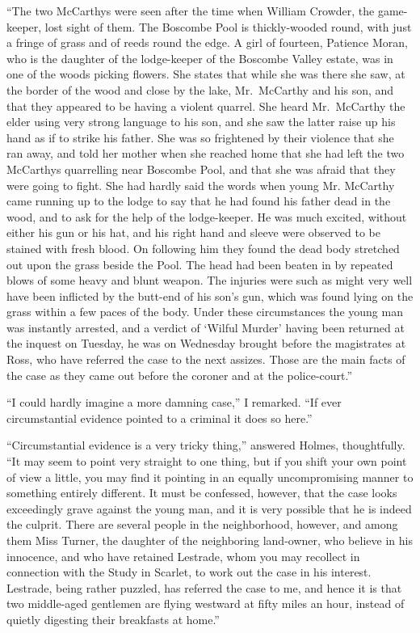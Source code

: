 “The two McCarthys were seen after the time when William
Crowder, the game-keeper, lost sight of them. The
Boscombe Pool is thickly-wooded round, with just a fringe of
grass and of reeds round the edge. A girl of fourteen, Patience
Moran, who is the daughter of the lodge-keeper of
the Boscombe Valley estate, was in one of the woods picking
flowers. She states that while she was there she saw, at
the border of the wood and close by the lake, Mr.~McCarthy
and his son, and that they appeared to be having a violent
quarrel. She heard Mr.~McCarthy the elder using very strong
language to his son, and she saw the latter raise up his hand
as if to strike his father. She was so frightened by their violence
that she ran away, and told her mother when she reached
home that she had left the two McCarthys quarrelling near
Boscombe Pool, and that she was afraid that they were going
to fight. She had hardly said the words when young Mr.
McCarthy came running up to the lodge to say that he had
found his father dead in the wood, and to ask for the help of
the lodge-keeper. He was much excited, without either his
gun or his hat, and his right hand and sleeve were observed
to be stained with fresh blood. On following him they found
the dead body stretched out upon the grass beside the Pool.
The head had been beaten in by repeated blows of some heavy
and blunt weapon. The injuries were such as might very
well have been inflicted by the butt-end of his son’s gun,
which was found lying on the grass within a few paces of the
body. Under these circumstances the young man was instantly
arrested, and a verdict of ‘Wilful Murder’ having been
returned at the inquest on Tuesday, he was on Wednesday
brought before the magistrates at Ross, who have referred the
case to the next assizes. Those are the main facts of the case
as they came out before the coroner and at the police-court.”

“I could hardly imagine a more damning case,” I remarked.
“If ever circumstantial evidence pointed to a criminal
it does so here.”

“Circumstantial evidence is a very tricky thing,” answered
Holmes, thoughtfully. “It may seem to point very straight
to one thing, but if you shift your own point of view a little,
you may find it pointing in an equally uncompromising manner
to something entirely different. It must be confessed,
however, that the case looks exceedingly grave against the
young man, and it is very possible that he is indeed the culprit.
There are several people in the neighborhood, however,
and among them Miss Turner, the daughter of the neighboring
land-owner, who believe in his innocence, and who have
retained Lestrade, whom you may recollect in connection
with the Study in Scarlet, to work out the case in his interest.
Lestrade, being rather puzzled, has referred the case to me,
and hence it is that two middle-aged gentlemen are flying
westward at fifty miles an hour, instead of quietly digesting
their breakfasts at home.”

